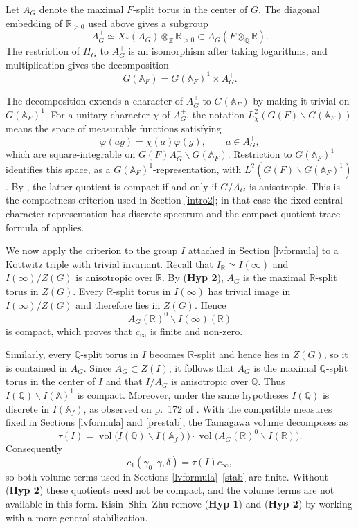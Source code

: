 \documentclass[11pt,a4paper]{article}
\newcommand{\HypOne}{\textbf{Hyp 1}}
\newcommand{\HypTwo}{\textbf{Hyp 2}}
\theoremstyle{definition}
\theoremstyle{plain}
\theoremstyle{remark}
\theoremstyle{plain}
\DeclareMathOperator{\vol}{vol}
\begin{document}
Let $A_G$ denote the maximal $F$-split torus in the center of $G$. The diagonal embedding of $\mathbb R_{>0}$ used above gives a subgroup
$$
    A_G^+\simeq X_*(A_G)\otimes_{\mathbb Z}\mathbb R_{>0}
    \subset A_G(F\otimes_{\mathbb Q}\mathbb R).
$$
The restriction of $H_G$ to $A_G^+$ is an isomorphism after taking logarithms, and multiplication gives the decomposition
$$
    G(\mathbb{A}_F)=G(\mathbb{A}_F)^1\times A_G^+.
$$

The decomposition extends a character of $A_G^+$ to $G(\mathbb{A}_F)$ by making it trivial on $G(\mathbb{A}_F)^1$. For a unitary character $\chi$ of $A_G^+$, the notation $L^2_{\chi}(G(F)\backslash G(\mathbb{A}_F))$ means the space of measurable functions satisfying
$$
    \varphi(ag)=\chi(a)\varphi(g),\qquad a\in A_G^+,
$$
which are square-integrable on $G(F)A_G^+\backslash G(\mathbb{A}_F)$. Restriction to $G(\mathbb{A}_F)^1$ identifies this space, as a $G(\mathbb{A}_F)^1$-representation, with $L^2(G(F)\backslash G(\mathbb{A}_F)^1)$. By \cite[\S 5.3, Theorem 5.6]{MR4615820}, the latter quotient is compact if and only if $G/A_G$ is anisotropic. This is the compactness criterion used in Section \ref{intro2}; in that case the fixed-central-character representation has discrete spectrum and the compact-quotient trace formula of \cite[\S\S 1--3]{MR2192011} applies.

We now apply the criterion to the group $I$ attached in Section \ref{lvformula} to a Kottwitz triple with trivial invariant. Recall that $I_{\mathbb{R}}\simeq I(\infty)$ and $I(\infty)/Z(G)$ is anisotropic over $\mathbb{R}$. By (\HypTwo{}), $A_G$ is the maximal $\mathbb{R}$-split torus in $Z(G)$. Every $\mathbb{R}$-split torus in $I(\infty)$ has trivial image in $I(\infty)/Z(G)$ and therefore lies in $Z(G)$. Hence
$$
    A_G(\mathbb{R})^0\backslash I(\infty)(\mathbb{R})
$$
is compact, which proves that $c_{\infty}$ is finite and non-zero.

Similarly, every $\mathbb{Q}$-split torus in $I$ becomes $\mathbb{R}$-split and hence lies in $Z(G)$, so it is contained in $A_G$. Since $A_G\subset Z(I)$, it follows that $A_G$ is the maximal $\mathbb{Q}$-split torus in the center of $I$ and that $I/A_G$ is anisotropic over $\mathbb{Q}$. Thus $I(\mathbb{Q})\backslash I(\mathbb{A})^1$ is compact. Moreover, under the same hypotheses $I(\mathbb{Q})$ is discrete in $I(\mathbb{A}_f)$, as observed on p.~172 of \cite{MR1044820}. With the compatible measures fixed in Sections \ref{lvformula} and \ref{prestab}, the Tamagawa volume decomposes as
$$
    \tau(I)
    =\vol\bigl(I(\mathbb{Q})\backslash I(\mathbb{A}_f)\bigr)
     \cdot\vol\bigl(A_G(\mathbb{R})^0\backslash I(\mathbb{R})\bigr).
$$
Consequently
$$
    c_1(\gamma_0,\gamma,\delta)=\tau(I)c_{\infty},
$$
so both volume terms used in Sections \ref{lvformula}--\ref{stab} are finite. Without (\HypTwo{}) these quotients need not be compact, and the volume terms are not available in this form. Kisin--Shin--Zhu \cite{kisin2021stabletraceformulashimura} remove (\HypOne{}) and (\HypTwo{}) by working with a more general stabilization.

{}

\end{document}
